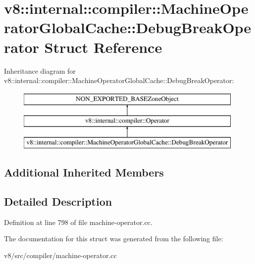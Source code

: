\hypertarget{structv8_1_1internal_1_1compiler_1_1MachineOperatorGlobalCache_1_1DebugBreakOperator}{}\section{v8\+:\+:internal\+:\+:compiler\+:\+:Machine\+Operator\+Global\+Cache\+:\+:Debug\+Break\+Operator Struct Reference}
\label{structv8_1_1internal_1_1compiler_1_1MachineOperatorGlobalCache_1_1DebugBreakOperator}
Inheritance diagram for v8\+:\+:internal\+:\+:compiler\+:\+:Machine\+Operator\+Global\+Cache\+:\+:Debug\+Break\+Operator\+:\begin{figure}[H]
\begin{center}
\leavevmode
\includegraphics[height=3.000000cm]{structv8_1_1internal_1_1compiler_1_1MachineOperatorGlobalCache_1_1DebugBreakOperator}
\end{center}
\end{figure}
\subsection*{Additional Inherited Members}


\subsection{Detailed Description}


Definition at line 798 of file machine-\/operator.\+cc.



The documentation for this struct was generated from the following file\+:\begin{DoxyCompactItemize}
\item 
v8/src/compiler/machine-\/operator.\+cc\end{DoxyCompactItemize}
